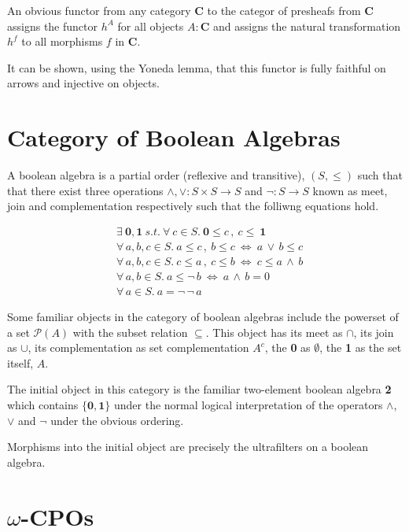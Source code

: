\documentclass[a4paper,12pt]{article}
\begin{document}
An obvious functor from any category \textbf{C} to the categor of presheafs from
\textbf{C} assigns the functor $h^{A}$ for all objects $A:\textbf{C}$ and
assigns the natural transformation $h^{f}$ to all morphisms $f$ in \textbf{C}.

It can be shown, using the Yoneda lemma, that this functor is fully faithful on
arrows and injective on objects.

\section{Category of Boolean Algebras}
A boolean algebra is a partial order (reflexive and transitive), $(S, \leq)$ such that that
there exist three operations $\land, \lor: S\times S \rightarrow S$  and $\neg:
S \rightarrow S$ known as meet, join and complementation respectively such that
the folliwng equations hold.

\begin{align*}
    &\exists \ \textbf{0}, \textbf{1} \ s.t. \ \forall \ c \in S. \ \textbf{0}
    \leq c \, , \ c \leq \ \textbf{1} \\
    &\forall \, a, b, c \in S. \ a \leq c \, , \ b \leq c \ \Leftrightarrow \ a \,
    \lor \, b \leq c \\
    &\forall \, a, b, c  \in S. \ c \leq a \, , \ c \leq b \ \Leftrightarrow \ c
    \leq a \, \land \, b \\
    &\forall \, a, b \in S. \ a \leq \neg \, b \ \Leftrightarrow \ a \, \land \,
    b = 0 \\
    &\forall \, a \in S. \   a = \neg \, \neg \, a
\end{align*}

Some familiar objects in the category of boolean algebras include the powerset
of a set $\mathcal{P}(A)$ with the subset relation $\subseteq$. This object has
its meet as $\cap$, its join as $\cup$, its complementation as set
complementation $A^c$, the \textbf{0} as $\emptyset$, the \textbf{1} as the set
itself, $A$.

The initial object in this category is the familiar two-element boolean algebra
\textbf{2} which contains $ \{\textbf{0}, \textbf{1}\}$ under the normal logical
interpretation of the operators $\land$, $\lor$ and $\neg$ under the obvious
ordering.


Morphisms into the initial object are precisely the ultrafilters on a boolean
algebra.


\section{$\omega$-CPOs}
\end{document}
